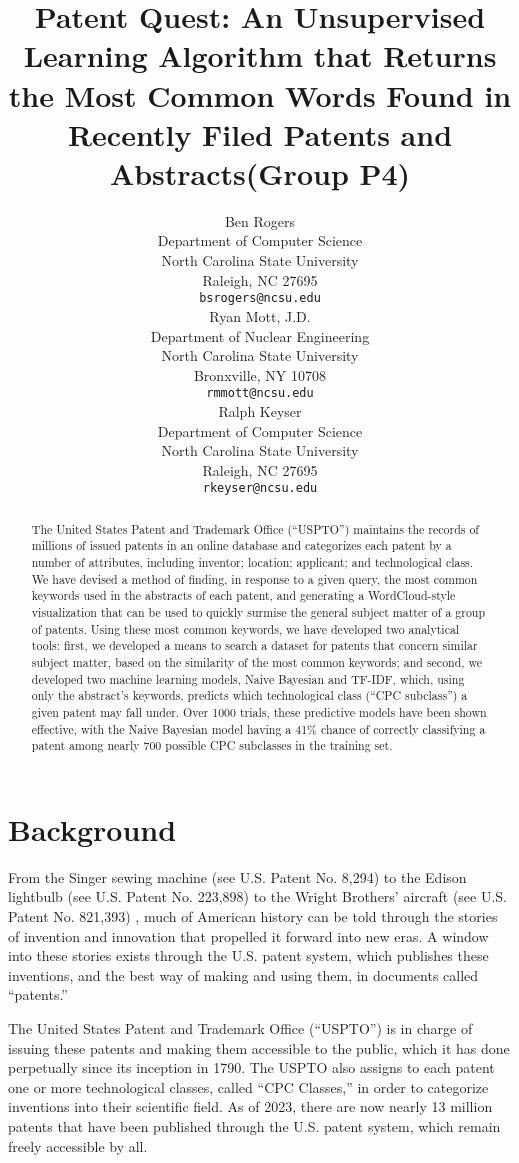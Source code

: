 \documentclass{article}
\title{Patent Quest: An Unsupervised Learning Algorithm that Returns the Most Common Words Found in Recently Filed Patents and Abstracts\newline (Group P4)}
\author{%
  Ben Rogers\\
  \small{Department of Computer Science}\\
  \small{North Carolina State University}\\
  \small{Raleigh, NC 27695} \\
  \texttt{bsrogers@ncsu.edu} \\
  \And
  Ryan Mott, J.D.\\
  \small{Department of Nuclear Engineering} \\
  \small{North Carolina State University} \\
  \small{Bronxville, NY 10708} \\
  \texttt{rmmott@ncsu.edu} \\
  \And
  Ralph Keyser \\
  \small{Department of Computer Science} \\
  \small{North Carolina State University} \\
  \small{Raleigh, NC 27695} \\
  \texttt{rkeyser@ncsu.edu} \\
}
\begin{document}
\maketitle

\begin{abstract}				
The United States Patent and Trademark Office (“USPTO”) maintains the records of millions of issued patents in an online database and categorizes each patent by a number of attributes, including inventor; location; applicant; and technological class.  We have devised a method of finding, in response to a given query, the most common keywords used in the abstracts of each patent, and generating a WordCloud-style visualization that can be used to quickly surmise the general subject matter of a group of patents. Using these most common keywords, we have developed two analytical tools: first, we developed a means to search a dataset for patents that concern similar subject matter, based on the similarity of the most common keywords; and second, we developed two machine learning models, Naive Bayesian and TF-IDF, which, using only the abstract’s keywords, predicts which technological class (“CPC subclass”) a given patent may fall under.  Over 1000 trials, these predictive models have been shown effective, with the Naive Bayesian model having a 41\% chance of correctly classifying a patent among nearly 700 possible CPC subclasses in the training set.
\end{abstract}


\section{Background}
From the Singer sewing machine (see U.S. Patent No. 8,294) to the Edison lightbulb (see U.S. Patent No. 223,898) to the Wright Brothers’ aircraft (see U.S. Patent No. 821,393) , much of American history can be told through the stories of invention and innovation that propelled it forward into new eras. A window into these stories exists through the U.S. patent system, which publishes these inventions, and the best way of making and using them, in documents called “patents.”

The United States Patent and Trademark Office (“USPTO”) is in charge of issuing these patents and making them accessible to the public, which it has done perpetually since its inception in 1790\cite{website:usptoms}. The USPTO also assigns to each patent one or more technological classes, called “CPC Classes,” in order to categorize inventions into their scientific field. As of 2023, there are now nearly 13 million patents that have been published through the U.S. patent system, which remain freely accessible by all\cite{website:usptoacc}.
\end{document}
